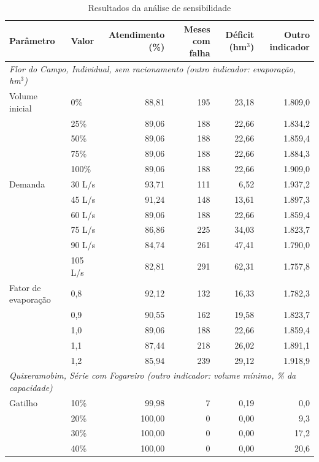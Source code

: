 \begin{table}[H]
    \captionsetup{width=15cm}
    \caption{Resultados da análise de sensibilidade}
    \label{tab:sensibilidade}
    \centering
    \scriptsize
    \begin{tabular}{llrrrr}
        \toprule
        Parâmetro & Valor & Atendimento (\%) & Meses com falha & Déficit (hm$^3$) & Outro indicador \\
        \midrule
        \multicolumn{6}{l}{\textit{Flor do Campo, Individual, sem racionamento (outro indicador: evaporação, hm$^3$)}} \\
        Volume inicial & 0\% & 88,81 & 195 & 23,18 & 1.809,0 \\
         & 25\% & 89,06 & 188 & 22,66 & 1.834,2 \\
         & 50\% & 89,06 & 188 & 22,66 & 1.859,4 \\
         & 75\% & 89,06 & 188 & 22,66 & 1.884,3 \\
         & 100\% & 89,06 & 188 & 22,66 & 1.909,0 \\
        Demanda & 30 L/s & 93,71 & 111 & 6,52 & 1.937,2 \\
         & 45 L/s & 91,24 & 148 & 13,61 & 1.897,3 \\
         & 60 L/s & 89,06 & 188 & 22,66 & 1.859,4 \\
         & 75 L/s & 86,86 & 225 & 34,03 & 1.823,7 \\
         & 90 L/s & 84,74 & 261 & 47,41 & 1.790,0 \\
         & 105 L/s & 82,81 & 291 & 62,31 & 1.757,8 \\
        Fator de evaporação & 0,8 & 92,12 & 132 & 16,33 & 1.782,3 \\
         & 0,9 & 90,55 & 162 & 19,58 & 1.823,7 \\
         & 1,0 & 89,06 & 188 & 22,66 & 1.859,4 \\
         & 1,1 & 87,44 & 218 & 26,02 & 1.891,1 \\
         & 1,2 & 85,94 & 239 & 29,12 & 1.918,9 \\
        \midrule
        \multicolumn{6}{l}{\textit{Quixeramobim, Série com Fogareiro (outro indicador: volume mínimo, \% da capacidade)}} \\
        Gatilho & 10\% & 99,98 & 7 & 0,19 & 0,0 \\
         & 20\% & 100,00 & 0 & 0,00 & 9,3 \\
         & 30\% & 100,00 & 0 & 0,00 & 17,2 \\
         & 40\% & 100,00 & 0 & 0,00 & 20,6 \\

\end{tabular}
\end{table}
